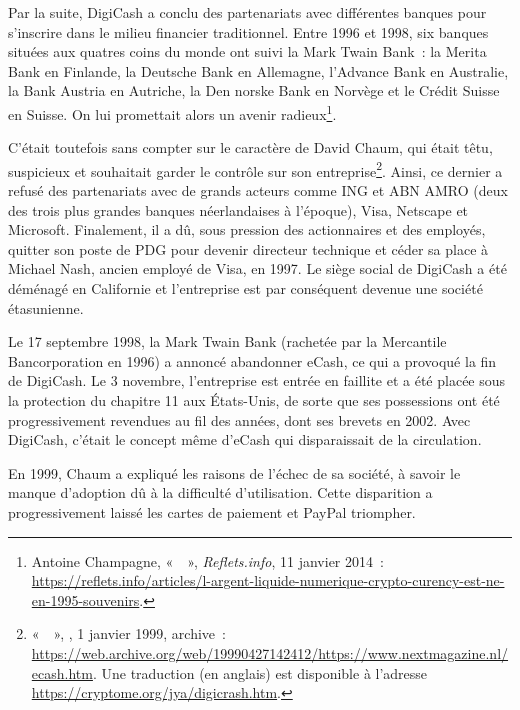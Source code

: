 Par la suite, DigiCash a conclu des partenariats avec différentes banques pour s'inscrire dans le milieu financier traditionnel. Entre 1996 et 1998, six banques situées aux quatres coins du monde ont suivi la Mark Twain Bank~: la Merita Bank en Finlande, la Deutsche Bank en Allemagne, l'Advance Bank en Australie, la Bank Austria en Autriche, la Den norske Bank en Norvège et le Crédit Suisse en Suisse. On lui promettait alors un avenir radieux\footnote{Antoine Champagne, «~~», \emph{Reflets.info}, 11 janvier 2014~: \url{https://reflets.info/articles/l-argent-liquide-numerique-crypto-curency-est-ne-en-1995-souvenirs}.}.

C'était toutefois sans compter sur le caractère de David Chaum, qui était têtu, suspicieux et souhaitait garder le contrôle sur son entreprise\footnote{«~~», , 1\ier{} janvier 1999, archive~: \url{https://web.archive.org/web/19990427142412/https://www.nextmagazine.nl/ecash.htm}. Une traduction (en anglais) est disponible à l'adresse \url{https://cryptome.org/jya/digicrash.htm}.}. Ainsi, ce dernier a refusé des partenariats avec de grands acteurs comme ING et ABN AMRO (deux des trois plus grandes banques néerlandaises à l'époque), Visa, Netscape et Microsoft. Finalement, il a dû, sous pression des actionnaires et des employés, quitter son poste de PDG pour devenir directeur technique et céder sa place à Michael Nash, ancien employé de Visa, en 1997. Le siège social de DigiCash a été déménagé en Californie et l'entreprise est par conséquent devenue une société étasunienne.

Le 17 septembre 1998, la Mark Twain Bank (rachetée par la Mercantile Bancorporation en 1996) a annoncé abandonner eCash, ce qui a provoqué la fin de DigiCash. Le 3 novembre, l'entreprise est entrée en faillite et a été placée sous la protection du chapitre 11 aux États-Unis, de sorte que ses possessions ont été progressivement revendues au fil des années, dont ses brevets en 2002. Avec DigiCash, c'était le concept même d'eCash qui disparaissait de la circulation.

En 1999, Chaum a expliqué les raisons de l'échec de sa société, à savoir le manque d'adoption dû à la difficulté d'utilisation. Cette disparition a progressivement laissé les cartes de paiement et PayPal triompher. %

